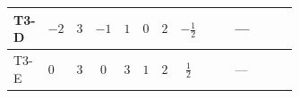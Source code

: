 \documentclass[8pt]{article}
\begin{document}
\begin{landscape}
\begin{longtable}{@{}llcccccc >{\raggedright\arraybackslash}p{0.21\linewidth} >{\raggedright\arraybackslash}p{0.21\linewidth} >{\raggedright\arraybackslash}p{0.21\linewidth}@{}}
\midrule
T3-D & $-2$ & $3$ & $-1$ & $1$ & $0$ & $2$ & $-\frac{1}{2}$ & \scriptsize\adjustbox{max width=\linewidth}{$\begin{gathered} +4 {\lambda_{H2}} {\lambda_{T3}}\end{gathered}$} & --- & \scriptsize\adjustbox{max width=\linewidth}{$\begin{gathered} -\frac{21 {g_2}^2 {\lambda_{T3}}}{2}\end{gathered}$} \\
\midrule
T3-E & $0$ & $3$ & $0$ & $3$ & $1$ & $2$ & $\frac{1}{2}$ & \scriptsize\adjustbox{max width=\linewidth}{$\begin{gathered} +4 {\lambda_{H2}} {\lambda_{T3}}\end{gathered}$} & --- & \scriptsize\adjustbox{max width=\linewidth}{$\begin{gathered} -\frac{33 {g_2}^2 {\lambda_{T3}}}{2}\end{gathered}$} \\
\midrule
\bottomrule
\end{longtable}
\clearpage

\end{landscape}
\end{document}
